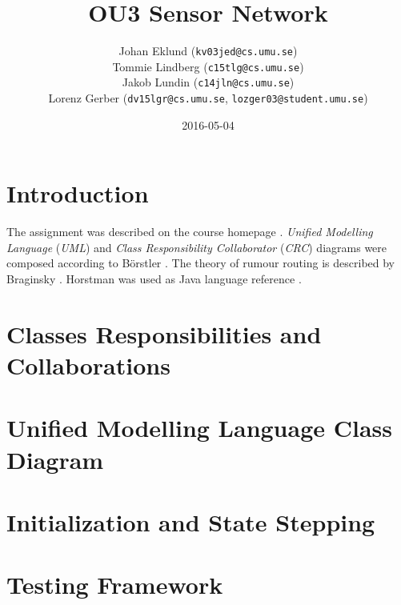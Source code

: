 \documentclass[a4paper,11pt,twoside]{article}
\title{OU3 Sensor Network}
\author{Johan Eklund ({\tt{kv03jed@cs.umu.se}}) \\ 
Tommie Lindberg ({\tt{c15tlg@cs.umu.se}}) \\
Jakob Lundin ({\tt{c14jln@cs.umu.se}}) \\
Lorenz Gerber ({\tt{dv15lgr@cs.umu.se}}, {\tt{lozger03@student.umu.se}})
}
\date{2016-05-04}
\begin{document}
\lstset{language=C}
\maketitle
\thispagestyle{empty}
\newpage
\tableofcontents
\thispagestyle{empty}
\newpage

\clearpage
{}

\section{Introduction} 
The assignment was described on the course homepage
\cite{sensornetwork}. \textit{Unified Modelling Language}
(\textit{UML}) and \textit{Class Responsibility Collaborator}
(\textit{CRC}) diagrams were composed according to Börstler
\cite{roleplay}. The theory of rumour routing is described by Braginsky
\cite{braginsky2002}. Horstman was used as Java language reference
\cite{horstman2014}.


\section{Classes Responsibilities and Collaborations}


\section{Unified Modelling Language Class Diagram}



\section{Initialization and State Stepping}

\section{Testing Framework}



\end{document}
